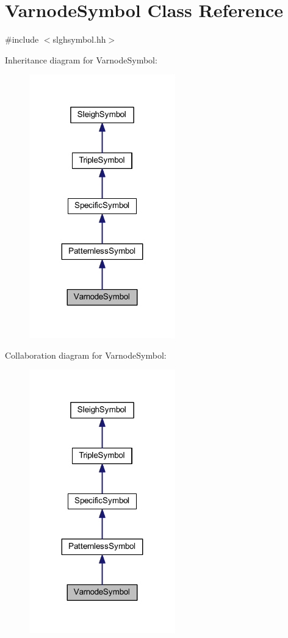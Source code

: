 \hypertarget{class_varnode_symbol}{}\section{Varnode\+Symbol Class Reference}
\label{class_varnode_symbol}


{\ttfamily \#include $<$slghsymbol.\+hh$>$}



Inheritance diagram for Varnode\+Symbol\+:
\nopagebreak
\begin{figure}[H]
\begin{center}
\leavevmode
\includegraphics[width=179pt]{class_varnode_symbol__inherit__graph}
\end{center}
\end{figure}


Collaboration diagram for Varnode\+Symbol\+:
\nopagebreak
\begin{figure}[H]
\begin{center}
\leavevmode
\includegraphics[width=179pt]{class_varnode_symbol__coll__graph}
\end{center}
\end{figure}
